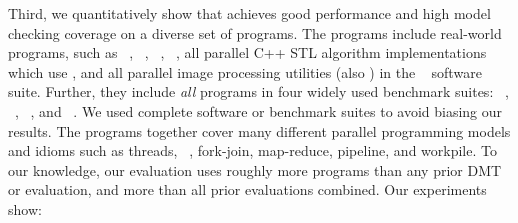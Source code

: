 Third, we quantitatively show that \parrot achieves good performance and high
model checking coverage on a diverse set of \nprog programs.  The programs
include \nrealprog real-world programs, such as \bdb~\cite{berkeleydb},
\openldap~\cite{openldap}, \redis~\cite{redis}, \mplayer~\cite{mplayer},
all \nstl parallel C++ STL algorithm 
implementations~\cite{parallel-stl} which use \openmp, and all \nimagick
parallel image processing utilities (also \openmp) in the \imagick~\cite{imagick}
software suite.  Further, they
include \emph{all} \nbenchmarks programs in four widely used benchmark suites:
\parsec~\cite{parsec}, \phoenix~\cite{phoenix-benchmarks}, \splashx~\cite{splashx},
and \npb~\cite{npb}.  We used complete software or benchmark suites to
avoid biasing our results. The programs together cover many different
parallel programming models and idioms such as threads,
\openmp~\cite{openmp}, fork-join, map-reduce, pipeline, and workpile.  To
our knowledge, our
evaluation uses roughly \overeach more programs than any prior
DMT or \smt evaluation, and \overcombined more than all
prior evaluations combined.
Our experiments show:
